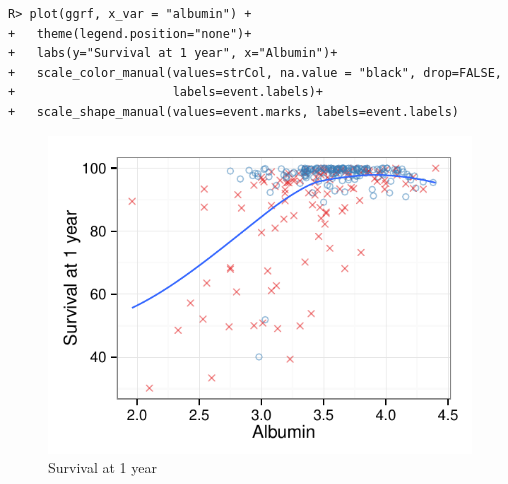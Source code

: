 \documentclass[nojss]{jss}
\begin{document}
\begin{knitrout}\footnotesize
{}\color{fgcolor}\begin{kframe}
\begin{verbatim}
R> plot(ggrf, x_var = "albumin") +
+   theme(legend.position="none")+
+   labs(y="Survival at 1 year", x="Albumin")+
+   scale_color_manual(values=strCol, na.value = "black", drop=FALSE,
+                      labels=event.labels)+
+   scale_shape_manual(values=event.marks, labels=event.labels)
\end{verbatim}
\end{kframe}\begin{figure}[!htpb]

{\centering \includegraphics[width=\maxwidth]{figure/rfs-variable-plotAlbumin-1} 

}

\caption[Survival at 1 year]{Survival at 1 year\label{fig:variable-plotAlbumin}}
\end{figure}


\end{knitrout}
\end{document}
